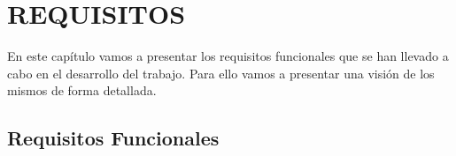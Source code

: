 
\chapter{REQUISITOS}  

En este capítulo vamos a presentar los requisitos funcionales que se han llevado a cabo en el desarrollo del trabajo. Para ello vamos a presentar una visión de los mismos de forma detallada.

\section{Requisitos Funcionales}

